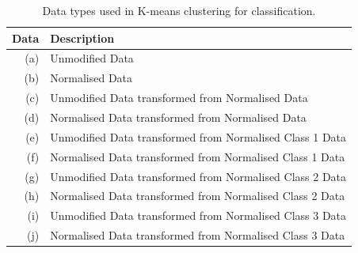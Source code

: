\documentclass[a4paper, 10pt, conference]{ieeeconf}
\begin{document}

\begin{table}[!ht]
\centering
\caption{Data types used in K-means clustering for classification.}
\label{tbl:types}
\begin{tabular}{|r|l|}
\hline
\textbf{Data} & \textbf{Description} \\ \hline
(a) & Unmodified Data\\
(b) & Normalised Data\\
(c) & Unmodified Data transformed from Normalised Data\\
(d) & Normalised Data transformed from Normalised Data\\
(e) & Unmodified Data transformed from Normalised Class 1 Data\\
(f) & Normalised Data transformed from Normalised Class 1 Data\\
(g) & Unmodified Data transformed from Normalised Class 2 Data\\
(h) & Normalised Data transformed from Normalised Class 2 Data\\
(i) & Unmodified Data transformed from Normalised Class 3 Data\\
(j) & Normalised Data transformed from Normalised Class 3 Data\\\hline
\end{tabular}
\end{table}
\end{document}
